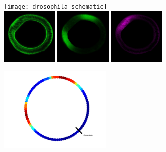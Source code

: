 \documentclass[10pt]{article}
\begin{document}
\begin{figure}[H]
\begin{center}
\begin{subfigure}{0.55\textwidth}
\texttt{[image: drosophila\_schematic]}\\
\includegraphics[width=0.3\textwidth]{drosophila_membrane}
\includegraphics[width=0.3\textwidth]{drosophila_dpERK}
\includegraphics[width=0.3\textwidth]{drosophila_DI}
\caption{}
\end{subfigure}
\begin{subfigure}{0.35\textwidth}
\centering
\includegraphics[width=0.6\textwidth]{circle_profile}\\

\end{subfigure}
\end{center}
\end{figure}
\end{document}
